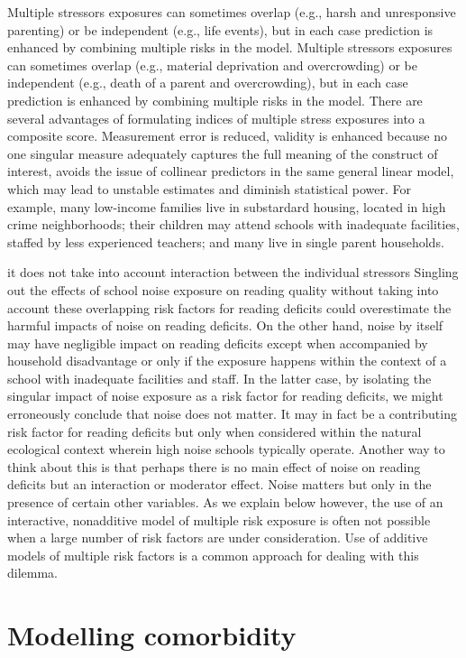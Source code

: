 \documentclass[
  letterpaper,
  DIV=11,
  numbers=noendperiod]{scrreport}
\begin{document}
Multiple stressors exposures can sometimes overlap (e.g., harsh and
unresponsive parenting) or be independent (e.g., life events), but in
each case prediction is enhanced by combining multiple risks in the
model. Multiple stressors exposures can sometimes overlap (e.g.,
material deprivation and overcrowding) or be independent (e.g., death of
a parent and overcrowding), but in each case prediction is enhanced by
combining multiple risks in the model. There are several advantages of
formulating indices of multiple stress exposures into a composite score.
Measurement error is reduced, validity is enhanced because no one
singular measure adequately captures the full meaning of the construct
of interest, avoids the issue of collinear predictors in the same
general linear model, which may lead to unstable estimates and diminish
statistical power. For example, many low-income families live in
substardard housing, located in high crime neighborhoods; their children
may attend schools with inadequate facilities, staffed by less
experienced teachers; and many live in single parent households.

it does not take into account interaction between the individual
stressors Singling out the effects of school noise exposure on reading
quality without taking into account these overlapping risk factors for
reading deficits could overestimate the harmful impacts of noise on
reading deficits. On the other hand, noise by itself may have negligible
impact on reading deficits except when accompanied by household
disadvantage or only if the exposure happens within the context of a
school with inadequate facilities and staff. In the latter case, by
isolating the singular impact of noise exposure as a risk factor for
reading deficits, we might erroneously conclude that noise does not
matter. It may in fact be a contributing risk factor for reading
deficits but only when considered within the natural ecological context
wherein high noise schools typically operate. Another way to think about
this is that perhaps there is no main effect of noise on reading
deficits but an interaction or moderator effect. Noise matters but only
in the presence of certain other variables. As we explain below however,
the use of an interactive, nonadditive model of multiple risk exposure
is often not possible when a large number of risk factors are under
consideration. Use of additive models of multiple risk factors is a
common approach for dealing with this dilemma.

\section{Modelling comorbidity}\label{modelling-comorbidity}
\end{document}

